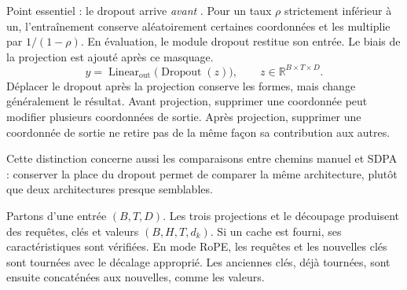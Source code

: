 Point essentiel : le dropout arrive \emph{avant} . Pour un taux $\rho$ strictement inférieur à un, l'entraînement conserve aléatoirement certaines coordonnées et les multiplie par $1/(1-\rho)$. En évaluation, le module dropout restitue son entrée. Le biais de la projection est ajouté après ce masquage.
\[
 y=\operatorname{Linear}_{\mathrm{out}}
       \bigl(\operatorname{Dropout}(z)\bigr),
 \qquad z\in\mathbb{R}^{B\times T\times D}.
\]
Déplacer le dropout après la projection conserve les formes, mais change généralement le résultat. Avant projection, supprimer une coordonnée peut modifier plusieurs coordonnées de sortie. Après projection, supprimer une coordonnée de sortie ne retire pas de la même façon sa contribution aux autres.

Cette distinction concerne aussi les comparaisons entre chemins manuel et SDPA : conserver la place du dropout permet de comparer la même architecture, plutôt que deux architectures presque semblables.






Partons d'une entrée $(B,T,D)$. Les trois projections et le découpage produisent des requêtes, clés et valeurs $(B,H,T,d_k)$. Si un cache est fourni, ses caractéristiques sont vérifiées. En mode RoPE, les requêtes et les nouvelles clés sont tournées avec le décalage approprié. Les anciennes clés, déjà tournées, sont ensuite concaténées aux nouvelles, comme les valeurs.


